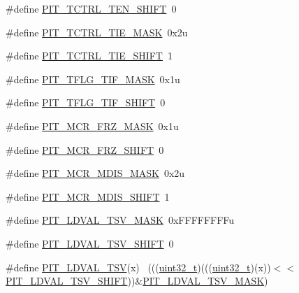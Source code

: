 \begin{DoxyCompactItemize}
\item 
\#define \hyperlink{group___p_i_t___register___masks_ga0080137ff0378087f08cc12fd10b3e1f}{P\+I\+T\+\_\+\+T\+C\+T\+R\+L\+\_\+\+T\+E\+N\+\_\+\+S\+H\+I\+FT}~0
\item 
\#define \hyperlink{group___p_i_t___register___masks_ga99639aabcac1d6042d14e7893d00bf67}{P\+I\+T\+\_\+\+T\+C\+T\+R\+L\+\_\+\+T\+I\+E\+\_\+\+M\+A\+SK}~0x2u
\item 
\#define \hyperlink{group___p_i_t___register___masks_gae21aee9e81741a924c9f2824fbc5775b}{P\+I\+T\+\_\+\+T\+C\+T\+R\+L\+\_\+\+T\+I\+E\+\_\+\+S\+H\+I\+FT}~1
\item 
\#define \hyperlink{group___p_i_t___register___masks_ga9de8d708b43c9ca35df26c7b43f09769}{P\+I\+T\+\_\+\+T\+F\+L\+G\+\_\+\+T\+I\+F\+\_\+\+M\+A\+SK}~0x1u
\item 
\#define \hyperlink{group___p_i_t___register___masks_gaf6f5ddca2193ed04bc61bc3e899f5ced}{P\+I\+T\+\_\+\+T\+F\+L\+G\+\_\+\+T\+I\+F\+\_\+\+S\+H\+I\+FT}~0
\item 
\#define \hyperlink{group___p_i_t___register___masks_ga8149a0bb21843632dd4528b540480ba7}{P\+I\+T\+\_\+\+M\+C\+R\+\_\+\+F\+R\+Z\+\_\+\+M\+A\+SK}~0x1u
\item 
\#define \hyperlink{group___p_i_t___register___masks_ga500ccd29eaebc20aa853e7bbb23e3c0c}{P\+I\+T\+\_\+\+M\+C\+R\+\_\+\+F\+R\+Z\+\_\+\+S\+H\+I\+FT}~0
\item 
\#define \hyperlink{group___p_i_t___register___masks_ga024258b2c23ff75f3e161e56adbbe733}{P\+I\+T\+\_\+\+M\+C\+R\+\_\+\+M\+D\+I\+S\+\_\+\+M\+A\+SK}~0x2u
\item 
\#define \hyperlink{group___p_i_t___register___masks_ga7ddcd16550ff71e4ee5ac48022ae6fb6}{P\+I\+T\+\_\+\+M\+C\+R\+\_\+\+M\+D\+I\+S\+\_\+\+S\+H\+I\+FT}~1
\item 
\#define \hyperlink{group___p_i_t___register___masks_gab7929b3b8a0c170a50f57d97face5365}{P\+I\+T\+\_\+\+L\+D\+V\+A\+L\+\_\+\+T\+S\+V\+\_\+\+M\+A\+SK}~0x\+F\+F\+F\+F\+F\+F\+F\+Fu
\item 
\#define \hyperlink{group___p_i_t___register___masks_ga463855d2b42de901bad9bea868f4f48b}{P\+I\+T\+\_\+\+L\+D\+V\+A\+L\+\_\+\+T\+S\+V\+\_\+\+S\+H\+I\+FT}~0
\item 
\#define \hyperlink{group___p_i_t___register___masks_gad83c6bcd6b67260c3f41755dcd2734e0}{P\+I\+T\+\_\+\+L\+D\+V\+A\+L\+\_\+\+T\+SV}(x)                                              ~(((\hyperlink{_p_e___types_8h_a33594304e786b158f3fb30289278f5af}{uint32\+\_\+t})(((\hyperlink{_p_e___types_8h_a33594304e786b158f3fb30289278f5af}{uint32\+\_\+t})(x))$<$$<$\hyperlink{group___p_i_t___register___masks_ga463855d2b42de901bad9bea868f4f48b}{P\+I\+T\+\_\+\+L\+D\+V\+A\+L\+\_\+\+T\+S\+V\+\_\+\+S\+H\+I\+FT}))\&\hyperlink{group___p_i_t___register___masks_gab7929b3b8a0c170a50f57d97face5365}{P\+I\+T\+\_\+\+L\+D\+V\+A\+L\+\_\+\+T\+S\+V\+\_\+\+M\+A\+SK})
$$
\end{DoxyCompactItemize}
